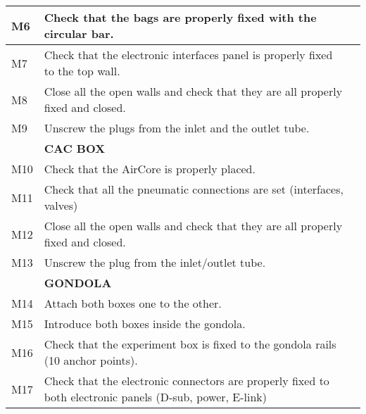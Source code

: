 \begin{longtable} {|m{}|m{}|m{}|}
\hline
M6 & Check that the bags are properly fixed with the circular bar. & \\
\hline
M7 & Check that the electronic interfaces panel is properly fixed to the top wall. & \\
\hline
M8 & Close all the open walls and check that they are all properly fixed and closed. & \\
\hline
M9 & Unscrew the plugs from the inlet and the outlet tube. & \\
\hline
& \textbf{CAC BOX} & \\
\hline
M10 & Check that the AirCore is properly placed. & \\
\hline
M11 & Check that all the pneumatic connections are set (interfaces, valves) & \\
\hline
M12 & Close all the open walls and check that they are all properly fixed and closed. & \\
\hline
M13 & Unscrew the plug from the inlet/outlet tube. & \\
\hline
& \textbf{GONDOLA} & \\
\hline
M14 &  Attach both boxes one to the other. & \\
\hline
M15 & Introduce both boxes inside the gondola. & \\
\hline
M16 & Check that the experiment box is fixed to the gondola rails (10 anchor points). & \\
\hline
M17 & Check that the electronic connectors are properly fixed to both electronic panels (D-sub, power, E-link) & \\
\hline


\end{longtable}
